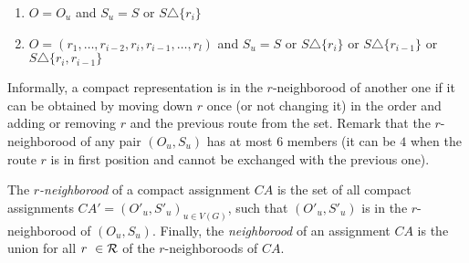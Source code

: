  \begin{enumerate} 
 \item $O = O_u$ and $S_u = S$ or $S \triangle \{r_i\}$  
 \item $O = (r_1,\dots,r_{i-2},r_{i},r_{i-1},\dots,r_{l})$ and $S_u = S$ or $S \triangle \{r_i\}$ or  $S \triangle \{r_{i-1}\}$ or $S \triangle \{r_i,r_{i-1}\}$ 
 \end{enumerate}

Informally, a compact representation is in the $r$-neighborood of another one if it can be obtained by 
moving down $r$ once (or not changing it) in the order and adding or removing $r$ and the previous route from the set. 
Remark that the $r$-neighborood of any pair $(O_u,S_u)$ has at most $6$ members (it can be $4$ when the route $r$ is in first position and cannot be exchanged with the previous one). 

The \emph{$r$-neighborood} of a compact assignment $CA$ is the set of all compact assignments $CA'=(O'_u,S'_u)_{u \in V(G)}$, such that  $(O'_u,S'_u)$ is in the $r$-neighborood of $(O_u,S_u)$. Finally, the \emph{neighborood} of an assignment $CA$ is the union for all $r \in {\cal R}$ of the $r$-neighboroods of $CA$.

% 
% 
% 
% 
% 

